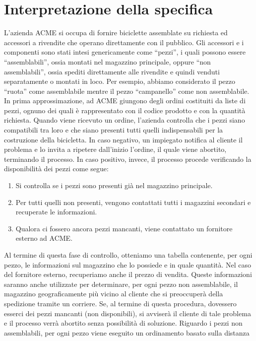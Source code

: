 \documentclass[twoside]{article}
\begin{document}
\section{Interpretazione della specifica}
L'azienda ACME si occupa di fornire biciclette assemblate su richiesta ed accessori
a rivendite che operano direttamente con il pubblico.
Gli accessori e i componenti sono stati intesi genericamente come ``pezzi'', i quali possono
essere ``assemblabili'', ossia montati nel magazzino principale, oppure ``non assemblabili'',
ossia spediti direttamente alle rivendite e quindi venduti separatamente o montati in loco.
Per esempio, abbiamo considerato il pezzo ``ruota'' come assemblabile mentre il pezzo ``campanello''
come non assemblabile.
In prima approssimazione, ad ACME giungono degli ordini costituiti da liste di pezzi,
ognuno dei quali è rappresentato con il codice prodotto e con la quantità richiesta.
Quando viene ricevuto un ordine, l'azienda controlla che i pezzi siano compatibili tra loro
e che siano presenti tutti quelli indispensabili per la costruzione della bicicletta. In caso
negativo, un impiegato notifica al cliente il problema e lo invita a ripetere dall'inizio l'ordine,
il quale viene abortito, terminando il processo.
In caso positivo, invece, il processo procede verificando la disponibilità dei pezzi come segue:
\begin{enumerate}
	\item Si controlla se i pezzi sono presenti già nel magazzino principale.
	\item Per tutti quelli non presenti, vengono contattati tutti i magazzini secondari e
		  recuperate le informazioni.
	\item Qualora ci fossero ancora pezzi mancanti, viene contattato un fornitore esterno
		  ad ACME.
\end{enumerate}
Al termine di questa fase di controllo, otteniamo una tabella contenente, per ogni pezzo, le informazioni sul
magazzino che lo possiede e in quale quantità. Nel caso del fornitore esterno, recuperiamo anche
il prezzo di vendita. Queste informazioni saranno anche utilizzate per determinare, per ogni pezzo non
assemblabile, il magazzino geograficamente più vicino al cliente che si preoccuperà della spedizione
tramite un corriere. Se, al termine di questa procedura, dovessero esserci dei pezzi mancanti
(non disponibili), si avviserà il cliente di tale problema e il processo verrà abortito senza
possibilità di soluzione. \newline
Riguardo i pezzi non assemblabili, per ogni pezzo viene eseguito un ordinamento basato sulla distanza
\end{document}
